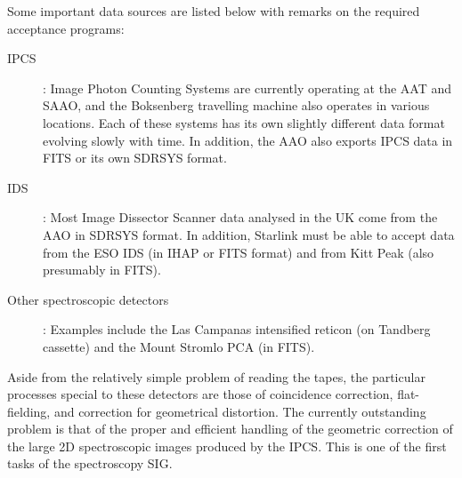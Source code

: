 Some important data sources are listed below with remarks on the required
acceptance programs:
\begin{description}
\item [IPCS]: Image Photon Counting Systems are currently operating at the AAT
and SAAO, and the Boksenberg travelling machine also operates in various
locations.
Each of these systems has its own slightly different data format evolving
slowly with time.
In addition, the AAO also exports IPCS data in FITS or its own SDRSYS format.
\item [IDS]: Most Image Dissector Scanner data analysed in the UK come from the
AAO in SDRSYS format.
In addition, Starlink must be able to accept data from the ESO IDS (in IHAP or
FITS format) and from Kitt Peak (also presumably in FITS).
\item [Other spectroscopic detectors]: Examples include the Las Campanas
intensified reticon (on Tandberg cassette) and the Mount Stromlo PCA (in FITS).
\end{description}
Aside from the relatively simple problem of reading the tapes, the particular
processes special to these detectors are those of coincidence correction,
flat-fielding, and correction for geometrical distortion.
The currently outstanding problem is that of the proper and efficient handling
of the geometric correction of the large 2D spectroscopic images produced by the
IPCS.
This is one of the first tasks of the spectroscopy SIG.

